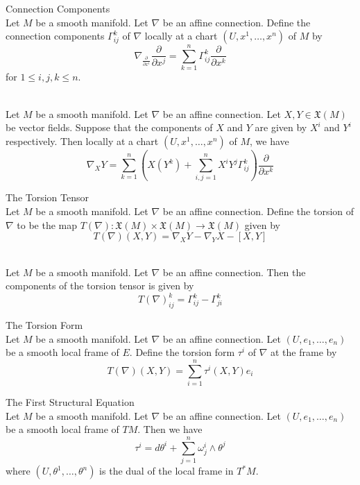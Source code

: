 \documentclass[a4paper]{article}
\begin{document}
\begin{defn}{Connection Components}{}\\
Let $M$ be a smooth manifold. Let $\nabla$ be an affine connection. Define the connection components $\Gamma_{ij}^k$ of $\nabla$ locally at a chart $(U,x^1,\dots,x^n)$ of $M$ by $$\nabla_{\frac{\partial}{\partial x^i}}\frac{\partial}{\partial x^j}=\sum_{k=1}^n\Gamma_{ij}^k\frac{\partial}{\partial x^k}$$ for $1\leq i,j,k\leq n$. 
\end{defn}

\begin{prp}{}{}\\
Let $M$ be a smooth manifold. Let $\nabla$ be an affine connection. Let $X,Y\in\mathfrak{X}(M)$ be vector fields. Suppose that the components of $X$ and $Y$ are given by $X^i$ and $Y^i$ respectively. Then locally at a chart $(U,x^1,\dots,x^n)$ of $M$, we have $$\nabla_XY=\sum_{k=1}^n\left(X(Y^k)+\sum_{i,j=1}^nX^iY^j\Gamma_{ij}^k\right)\frac{\partial}{\partial x^k}$$
\end{prp}

\begin{defn}{The Torsion Tensor}{}\\
Let $M$ be a smooth manifold. Let $\nabla$ be an affine connection. Define the torsion of $\nabla$ to be the map $T(\nabla):\mathfrak{X}(M)\times\mathfrak{X}(M)\to\mathfrak{X}(M)$ given by $$T(\nabla)(X,Y)=\nabla_XY-\nabla_YX-[X,Y]$$
\end{defn}

\begin{prp}{}{}\\
Let $M$ be a smooth manifold. Let $\nabla$ be an affine connection. Then the components of the torsion tensor is given by $$T(\nabla)_{ij}^k=\Gamma_{ij}^k-\Gamma_{ji}^k$$
\end{prp}

\begin{defn}{The Torsion Form}{}\\
Let $M$ be a smooth manifold. Let $\nabla$ be an affine connection. Let $(U,e_1,\dots,e_n)$ be a smooth local frame of $E$. Define the torsion form $\tau^i$ of $\nabla$ at the frame by $$T(\nabla)(X,Y)=\sum_{i=1}^n\tau^i(X,Y)e_i$$
\end{defn}

\begin{thm}{The First Structural Equation}{}\\
Let $M$ be a smooth manifold. Let $\nabla$ be an affine connection. Let $(U,e_1,\dots,e_n)$ be a smooth local frame of $TM$. Then we have $$\tau^i=d\theta^i+\sum_{j=1}^n\omega_j^i\wedge\theta^j$$ where $(U,\theta^1,\dots,\theta^n)$ is the dual of the local frame in $T^\ast M$. 
\end{thm}
\end{document}
